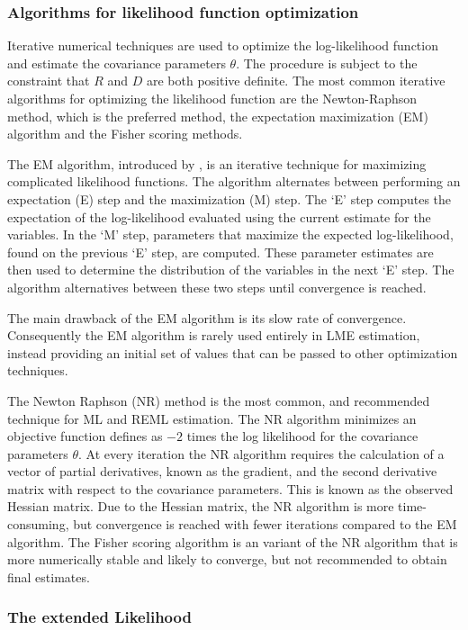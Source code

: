 \documentclass[12pt, a4paper]{report}
\theoremstyle{plain}
\theoremstyle{definition}
\theoremstyle{remark}
\begin{document}
			\subsubsection{Algorithms for likelihood function optimization}Iterative numerical techniques are used to optimize the log-likelihood function and estimate the covariance parameters $\theta$. The procedure is subject to the constraint that $R$ and $D$ are both positive definite. The most common iterative algorithms for optimizing the likelihood function are the Newton-Raphson method, which is the preferred method, the expectation maximization (EM) algorithm and the Fisher scoring methods.
			
			The EM algorithm, introduced by \citet{EM}, is an iterative technique for maximizing complicated likelihood functions. The algorithm alternates between performing an expectation (E) step
			and the maximization (M) step. The `E' step computes the expectation of the log-likelihood evaluated using the current
			estimate for the variables. In the `M' step, parameters that maximize the expected log-likelihood, found on the previous `E' step, are computed. These parameter estimates are then used to determine the distribution of the variables in the next `E' step. The algorithm alternatives between these two steps until convergence is reached.
			
			The main drawback of the EM algorithm is its slow rate of
			convergence. Consequently the EM algorithm is rarely used entirely in LME estimation,
			instead providing an initial set of values that can be passed to
			other optimization techniques.
			
			The Newton Raphson (NR) method is the most common, and recommended technique for ML and
			REML estimation. The NR algorithm minimizes an objective function defines as $-2$ times the log likelihood for the covariance parameters $\theta$. At every iteration the NR algorithm requires the
			calculation of a vector of partial derivatives, known as the gradient, and the second derivative matrix with respect to the covariance parameters. This is known as the observed Hessian matrix. Due to the Hessian matrix, the NR algorithm is more time-consuming, but convergence is reached with fewer iterations compared to the EM algorithm. The Fisher scoring algorithm is an variant of the NR algorithm that is more numerically stable and likely to converge, but not recommended to obtain final estimates.
			
			\subsubsection{The extended Likelihood}
			
\end{document}
